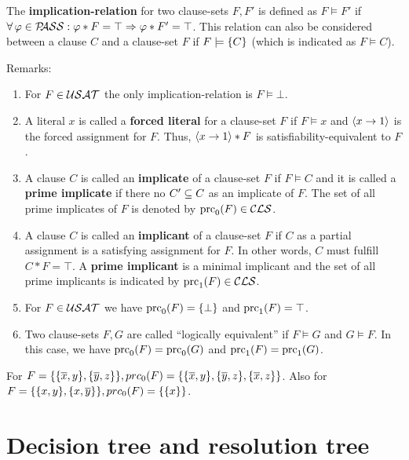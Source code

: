 \documentclass{report}
\begin{document}
\begin{defi}\label{def:imp-rel}
The \textbf{implication-relation} for two clause-sets $F, F'$ is defined as $F \models F'$ if $\forall\, \varphi \in \mathcal{P\hspace{-0.32em}ASS} : \varphi * F = \top \Rightarrow \varphi * F' = \top$. This relation can also be considered between a clause $C$ and a clause-set $F$ if $F \models \{ C \}$ (which is indicated as $F \models C$).
\end{defi}
Remarks:
  \begin{enumerate}
  \item For  $F \in \mathcal{USAT}$ the only implication-relation is $F \models \bot$.
  \item A literal $x$ is called a \textbf{forced literal} for a clause-set $F$ if $F \models x$ and $\langle x \rightarrow 1 \rangle$ is the forced assignment for $F$. Thus,  $\langle x \rightarrow 1 \rangle * F$ is satisfiability-equivalent to $F$.
  \item A clause $C$ is called an \textbf{implicate} of a clause-set $F$ if $F \models C$ and it is called a \textbf{prime implicate} if there no $ C' \subseteq C$ as an implicate of $F$. The set of all prime implicates of $F$ is denoted by $\operatorname{prc}_0(F) \in \mathcal{CLS}$.
  \item A clause $C$ is called an \textbf{implicant} of a clause-set $F$ if $C$ as a partial assignment is a satisfying assignment for $F$. In other words, $C$ must fulfill $C * F=\top$. A \textbf{prime implicant} is a minimal implicant and the set of all prime implicants is indicated by $\operatorname{prc}_1(F) \in \mathcal{CLS}$. 
  \item For $F \in \mathcal{USAT}$ we have $\operatorname{prc}_0(F) = \{ \bot \}$ and $\operatorname{prc}_1(F) = \top$.
  \item Two clause-sets $F, G$ are called ``logically equivalent'' if $F \models G$ and $G \models F$. In this case, we have $\operatorname{prc}_0(F) = \operatorname{prc}_0(G)$ and $\operatorname{prc}_1(F) = \operatorname{prc}_1(G)$.
  \end{enumerate}

\begin{examp}\label{exp:bbb}
For $F = \{\{ \overline x, y\} , \{ \overline y, z\}\}, prc_0(F) = \{\{\overline x, y\} , \{\overline y, z\} , \{\overline x, z\}\}$. Also for $F = \{ \{ x, y \} , \{ x,\overline y \} \}, prc_0(F) = \{ \{ x \} \}$.
\end{examp}
\section{Decision tree and resolution tree}
\label{sec:trees}
\end{document}
